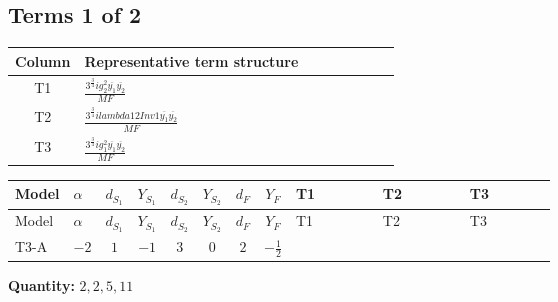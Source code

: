\documentclass[8pt]{article}
\begin{document}
\begin{landscape}
\subsection*{Terms 1 of 2}
\begin{center}
\begin{tabular}{@{}c >{\raggedright\arraybackslash}p{0.82\linewidth}@{}}
\toprule
Column & Representative term structure \\
\midrule
T1 & \(\displaystyle \frac{3^{\frac{3}{4}} i g_{2}^{2} \overline{y_{1}} \overline{y_{2}}}{MF}\) \\
\midrule
T2 & \(\displaystyle \frac{3^{\frac{3}{4}} i lambda12Inv1 \overline{y_{1}} \overline{y_{2}}}{MF}\) \\
\midrule
T3 & \(\displaystyle \frac{3^{\frac{3}{4}} i g_{1}^{2} \overline{y_{1}} \overline{y_{2}}}{MF}\) \\
\midrule
\bottomrule
\end{tabular}
\end{center}
\smallskip
\tiny
\begin{longtable}{@{}llcccccc >{\raggedright\arraybackslash}p{0.21\linewidth} >{\raggedright\arraybackslash}p{0.21\linewidth} >{\raggedright\arraybackslash}p{0.21\linewidth}@{}}
\toprule
Model & $\alpha$ & $d_{S_1}$ & $Y_{S_1}$ & $d_{S_2}$ & $Y_{S_2}$ & $d_F$ & $Y_F$ & T1 & T2 & T3 \\
\midrule
\endfirsthead
\toprule
Model & $\alpha$ & $d_{S_1}$ & $Y_{S_1}$ & $d_{S_2}$ & $Y_{S_2}$ & $d_F$ & $Y_F$ & T1 & T2 & T3 \\
\midrule
\endhead
T3-A & $-2$ & $1$ & $-1$ & $3$ & $0$ & $2$ & $-\frac{1}{2}$ & \scriptsize\adjustbox{max width=\linewidth}{$\begin{gathered} - \frac{11 \cdot 3^{\frac{3}{4}} i g_{2}^{2} \overline{y_{1}} \overline{y_{2}}}{8 MF}\end{gathered}$} & \scriptsize\adjustbox{max width=\linewidth}{$\begin{gathered} - \frac{3^{\frac{3}{4}} i lambda12Inv1 \overline{y_{1}} \overline{y_{2}}}{6 MF}\end{gathered}$} & \scriptsize\adjustbox{max width=\linewidth}{$\begin{gathered} - \frac{3^{\frac{3}{4}} i g_{1}^{2} \overline{y_{1}} \overline{y_{2}}}{8 MF}\end{gathered}$} \\
\midrule
\bottomrule
\end{longtable}
\clearpage
\noindent\textbf{Quantity: }$\mathrm{2,2,5,11}$\par\smallskip

\end{landscape}
\end{document}
